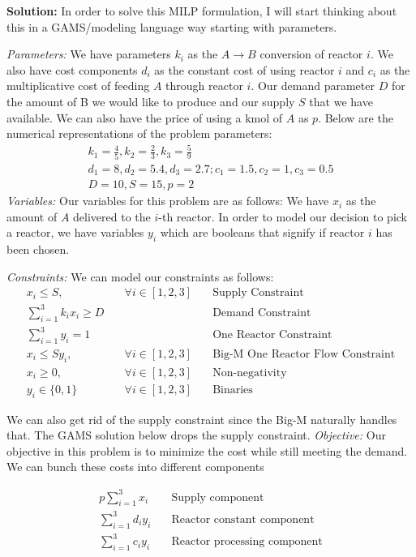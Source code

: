 \documentclass[11pt]{article}
\begin{document}
\textbf{Solution:}
In order to solve this MILP formulation, I will start thinking about this in a GAMS/modeling language way starting with parameters.

\textit{Parameters:} 
We have parameters $k_i$ as the $A \rightarrow B$ conversion of reactor $i$.
We also have cost components $d_i$ as the constant cost of using reactor $i$ and $c_i$ as the multiplicative cost of feeding $A$ through reactor $i$.
Our demand parameter $D$ for the amount of B we would like to produce and our supply $S$ that we have available.
We can also have the price of using a kmol of $A$ as $p$.
Below are the numerical representations of the problem parameters:
\begin{align*}
  k_1=\frac{4}{5}, k_2=\frac{2}{3}, k_3=\frac{5}{9} \\
  d_1=8, d_2=5.4, d_3=2.7; c_1=1.5, c_2=1, c_3=0.5 \\
  D = 10, S=15, p=2
\end{align*}
\textit{Variables:}
Our variables for this problem are as follows:
We have $x_{i}$ as the amount of $A$ delivered to the $i$-th reactor.
In order to model our decision to pick a reactor, we have variables $y_i$ which are booleans that signify if reactor $i$ has been chosen.

\textit{Constraints:}
We can model our constraints as follows:
\begin{align*}
  x_i \leq S, & \quad \forall i \in [1,2,3] & \quad \text{Supply Constraint} \\
  \sum_{i=1}^{3} k_i x_i \geq D & \quad & \quad \text{Demand Constraint} \\
  \sum_{i=1}^{3} y_i = 1 & \quad & \quad \text{One Reactor Constraint} \\
  x_i \leq S y_i, & \quad \forall i \in [1,2,3] & \quad \text{Big-M One Reactor Flow Constraint} \\
  x_i \geq 0, & \quad \forall i \in [1,2,3] & \quad \text{Non-negativity} \\
  y_i \in \{ 0,1 \}  & \quad \forall i \in [1,2,3] & \quad \text{Binaries}
\end{align*}

We can also get rid of the supply constraint since the Big-M naturally handles that.
The GAMS solution below drops the supply constraint.
\textit{Objective:}
Our objective in this problem is to minimize the cost while still meeting the demand.
We can bunch these costs into different components

\begin{align*}
  p\sum_{i=1}^{3}x_i  & \quad \text{Supply component} \\
  \sum_{i=1}^{3}d_i y_i & \quad \text{Reactor constant component} \\
  \sum_{i=1}^{3}c_i y_i & \quad \text{Reactor processing component} \\
\end{align*}
\end{document}
